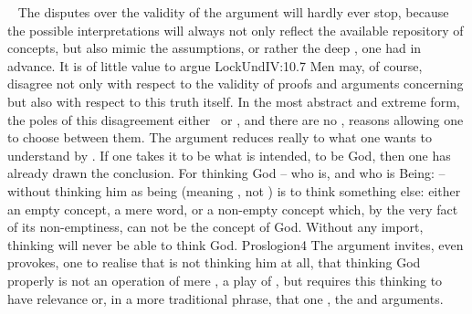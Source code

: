 \ \vspace*{-2ex}
\pa The disputes over the validity of the argument will hardly ever stop,
because the possible interpretations will always not only reflect the available
repository of concepts, but also mimic the assumptions, or rather the deep
, one had in advance.  It is of little value to argue
\citet{[h]ow far the idea of a most perfect being, which a man may frame in his
  mind, does or does not prove the existence of a God [...]  For in the
  different make of men's tempers and application of their thoughts, some
  arguments prevail more on one, and some on another, for the confirmation of
  the same truth.}{LockUnd}{IV:10.7} Men may, of course, disagree not only with
respect to the validity of proofs and arguments concerning 
but also with respect to this truth itself.  In the most abstract and extreme
form, the poles of this disagreement  either \yes\ or \No, and there
are no ,  reasons allowing one to choose between them.
The argument reduces really to what one wants to understand by .  If one takes it to be what is intended, to
be God, then one has already drawn the conclusion. For thinking God -- who is,
and who is Being:  -- without thinking him as being
(meaning , not ) is to think something else: either an
empty concept, a mere word, or a non-empty concept which, by the very fact of
its non-emptiness, can not be the concept of God.  Without any 
import, thinking will never be able to think God.
\citet{For in one sense a thing is thought when the word signifying it is
  thought; in another sense when the very object which the thing is is
  understood. In the first sense, then, God can be thought not to exist, but not
at all in the second sense. No one, indeed, understanding what God is can think
that God does not exist [...]}{Proslogion}{4}
The argument invites, even provokes, one to realise that  is not thinking him at all, that thinking God properly is not an
operation of mere , a play of , but requires this
thinking to have  relevance or, in a more traditional phrase,
that one ,  the
 and arguments.



